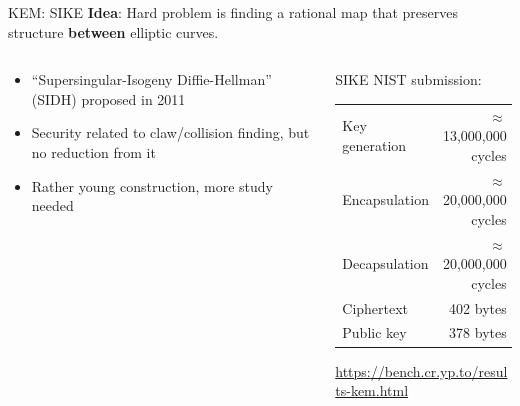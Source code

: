 \documentclass[xcolor=table,10pt,aspectratio=169]{beamer}
\begin{document}
\begin{frame}[label={sec:orgd0ed514}]{KEM: SIKE}
\textbf{Idea}: Hard problem is finding a rational map that preserves structure \textbf{between} elliptic curves.

\begin{columns}[t]
\begin{column}{0.5\columnwidth}
\begin{itemize}
\item “Supersingular-Isogeny Diffie-Hellman” (SIDH) proposed in 2011
\item Security related to claw/collision finding, but no reduction from it
\item Rather young construction, more study needed
\end{itemize}
\end{column}

\begin{column}{0.5\columnwidth}
SIKE NIST submission:

\begin{center}
\begin{tabular}{lr}
Key generation & \(\approx\) 13,000,000 cycles\\
Encapsulation & \(\approx\) 20,000,000 cycles\\
Decapsulation & \(\approx\) 20,000,000 cycles\\
Ciphertext & 402 bytes\\
Public key & 378 bytes\\
\end{tabular}

\end{center}

\small \url{https://bench.cr.yp.to/results-kem.html}
\end{column}
\end{columns}
\end{frame}
\end{document}
